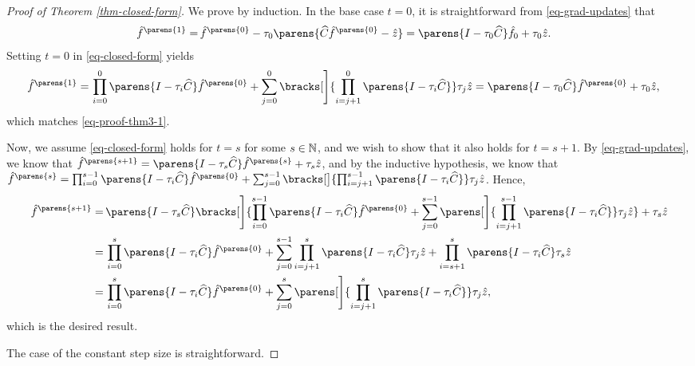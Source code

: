 \begin{proof}[Proof of Theorem \ref{thm-closed-form}]
	We prove by induction. In the base case $t = 0$, it is straightforward from \eqref{eq-grad-updates} that 
	\begin{align}\label{eq-proof-thm3-1}
		\hat{f}^{\parens{1}} = & \, \hat{f}^{\parens{0}} - \tau_0 \parens{\widehat{C} \hat{f}^{\parens{0}} - \hat{z}} = \parens{I - \tau_0 \widehat{C}} \hat{f}_{0} + \tau_0 \hat{z}. 
	\end{align}
	Setting $t=0$ in \eqref{eq-closed-form} yields
	\begin{align*}
		\hat{f}^{\parens{1}} = & \, \prod_{i=0}^0 \parens{I - \tau_i \widehat{C}} \hat{f}^{\parens{0}} + \sum_{j=0}^0 \bracks[\Bigg]{\prod_{i=j+1}^0 \parens{I - \tau_i \widehat{C}}} \tau_j \hat{z} 
		= \parens{I - \tau_0 \widehat{C}} \hat{f}^{\parens{0}} + \tau_0 \hat{z}, 
	\end{align*}
	which matches \eqref{eq-proof-thm3-1}. 
	
	Now, we assume \eqref{eq-closed-form} holds for $t = s$ for some $s \in \mathbb{N}$, and we wish to show that it also holds for $t = s+1$. By \eqref{eq-grad-updates}, we know that $\hat{f}^{\parens{s+1}} = \parens{I - \tau_s \widehat{C}} \hat{f}^{\parens{s}} + \tau_s \hat{z}$, and by the inductive hypothesis, we know that $\hat{f}^{\parens{s}} = \prod_{i=0}^{s-1} \parens{I - \tau_i \widehat{C}} \hat{f}^{\parens{0}} + \sum_{j=0}^{s-1} \bracks[\big]{\prod_{i=j+1}^{s-1} \parens{I - \tau_i \widehat{C}}} \tau_j \hat{z}$. Hence, 
	\begin{align*}
		\hat{f}^{\parens{s+1}} %
		= & \, \parens{I - \tau_s \widehat{C}} \bracks[\Bigg]{\prod_{i=0}^{s-1} \parens{I - \tau_i \widehat{C}} \hat{f}^{\parens{0}} + \sum_{j=0}^{s-1} \parens[\Bigg]{\prod_{i=j+1}^{s-1} \parens{I - \tau_i \widehat{C}}} \tau_j \hat{z}} + \tau_s \hat{z} \\ 
		= & \, \prod_{i=0}^{s} \parens{I - \tau_i \widehat{C}} \hat{f}^{\parens{0}} + \sum_{j=0}^{s-1} \prod_{i=j+1}^{s} \parens{I - \tau_i \widehat{C}} \tau_j \hat{z} + \prod_{i=s+1}^s \parens{I - \tau_i \widehat{C}} \tau_s \hat{z} \\ 
		= & \, \prod_{i=0}^{s} \parens{I - \tau_i \widehat{C}} \hat{f}^{\parens{0}} + \sum_{j=0}^{s} \parens[\Bigg]{\prod_{i=j+1}^{s} \parens{I - \tau_i \widehat{C}}} \tau_j \hat{z},  
	\end{align*}
	which is the desired result. 
	
	The case of the constant step size is straightforward. 
\end{proof}



